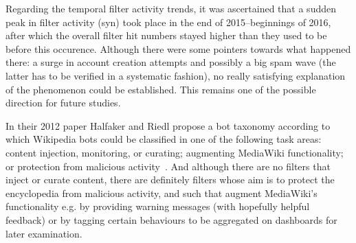 Regarding the temporal filter activity trends, it was ascertained that a sudden peak in filter activity (syn) took place in the end of 2015–beginnings of 2016, after which the overall filter hit numbers stayed higher than they used to be before this occurence.
Although there were some pointers towards what happened there:
a surge in account creation attempts and possibly a big spam wave (the latter has to be verified in a systematic fashion),
no really satisfying explanation of the phenomenon could be established.
This remains one of the possible direction for future studies.


In their 2012 paper Halfaker and Riedl propose a bot taxonomy according to which Wikipedia bots could be classified in one of the following task areas: content injection, monitoring, or curating; augmenting MediaWiki functionality; or protection from malicious activity~\cite{HalRied2012}.
And although there are no filters that inject or curate content, there are definitely filters whose aim is to protect the encyclopedia from malicious activity, and such that augment MediaWiki's functionality e.g. by providing warning messages (with hopefully helpful feedback) or by tagging certain behaviours to be aggregated on dashboards for later examination.

